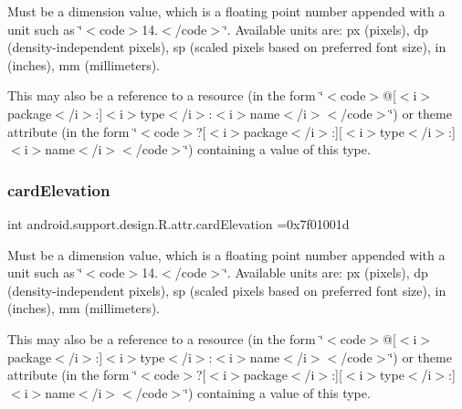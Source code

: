 Must be a dimension value, which is a floating point number appended with a unit such as \char`\"{}$<$code$>$14.\+5sp$<$/code$>$\char`\"{}. Available units are\+: px (pixels), dp (density-\/independent pixels), sp (scaled pixels based on preferred font size), in (inches), mm (millimeters). 

This may also be a reference to a resource (in the form \char`\"{}$<$code$>$@\mbox{[}$<$i$>$package$<$/i$>$\+:\mbox{]}$<$i$>$type$<$/i$>$\+:$<$i$>$name$<$/i$>$$<$/code$>$\char`\"{}) or theme attribute (in the form \char`\"{}$<$code$>$?\mbox{[}$<$i$>$package$<$/i$>$\+:\mbox{]}\mbox{[}$<$i$>$type$<$/i$>$\+:\mbox{]}$<$i$>$name$<$/i$>$$<$/code$>$\char`\"{}) containing a value of this type. \mbox{\label{classandroid_1_1support_1_1design_1_1R_1_1attr_a98e65155e8f567fb4f1f99d3cef046d2}} 
\subsubsection{\texorpdfstring{card\+Elevation}{cardElevation}}
{\footnotesize\ttfamily int android.\+support.\+design.\+R.\+attr.\+card\+Elevation =0x7f01001d\hspace{0.3cm}{\ttfamily [static]}}

Must be a dimension value, which is a floating point number appended with a unit such as \char`\"{}$<$code$>$14.\+5sp$<$/code$>$\char`\"{}. Available units are\+: px (pixels), dp (density-\/independent pixels), sp (scaled pixels based on preferred font size), in (inches), mm (millimeters). 

This may also be a reference to a resource (in the form \char`\"{}$<$code$>$@\mbox{[}$<$i$>$package$<$/i$>$\+:\mbox{]}$<$i$>$type$<$/i$>$\+:$<$i$>$name$<$/i$>$$<$/code$>$\char`\"{}) or theme attribute (in the form \char`\"{}$<$code$>$?\mbox{[}$<$i$>$package$<$/i$>$\+:\mbox{]}\mbox{[}$<$i$>$type$<$/i$>$\+:\mbox{]}$<$i$>$name$<$/i$>$$<$/code$>$\char`\"{}) containing a value of this type. \mbox{\label{classandroid_1_1support_1_1design_1_1R_1_1attr_a4ab552f9212cc7ca0ffa111487bc3924}} 
